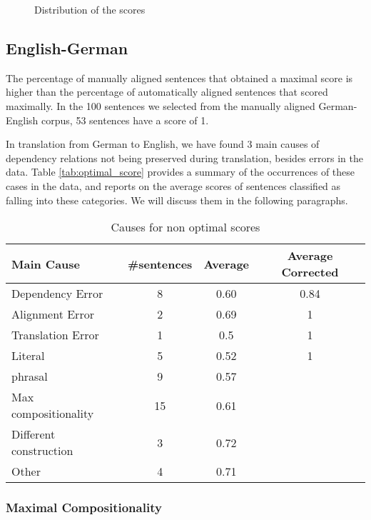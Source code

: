 \begin{figure}[!ht]

\caption{Distribution of the scores}\label{fig:scoredstrib2}
\end{figure}

\subsection{English-German}

The percentage of manually aligned sentences that obtained a maximal score is higher than the percentage of automatically aligned sentences that scored maximally. In the 100 sentences we selected from the manually aligned German-English corpus, 53 sentences have a score of 1.

In translation from German to English, we have found 3 main causes of dependency relations not being preserved during translation, besides errors in the data. Table \ref{tab:optimal_score} provides a summary of the occurrences of these cases in the data, and reports on the average scores of sentences classified as falling into these categories. We will discuss them in the following paragraphs. 

\begin{table}[!ht]
\centering
\begin{tabular}{|l|c|c|c|}
\hline
\textbf{Main Cause} & \textbf{\#sentences} & \textbf{Average} & \textbf{Average Corrected}\\
\hline \hline
Dependency Error & 8 & 0.60 & 0.84\\
\hline
Alignment Error & 2 & 0.69 & 1\\
\hline
Translation Error & 1 & 0.5 & 1\\
\hline
Literal & 5 & 0.52 & 1\\
\hline
phrasal& 9 & 0.57\\
\cline{1-3}
Max compositionality & 15 & 0.61 \\
\cline{1-3}
Different construction & 3 & 0.72 \\
\cline{1-3}
Other & 4 & 0.71\\
\cline{1-3}
\end{tabular}
\caption{Causes for non optimal scores}\label{tab:non_optimal}
\end{table}

\subsubsection{Maximal Compositionality}

